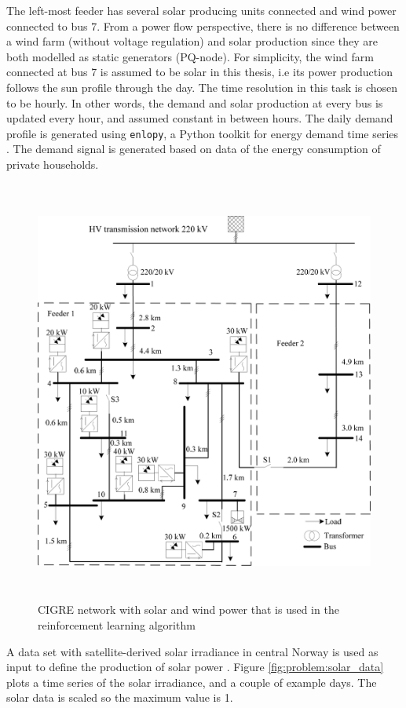 \documentclass[class=book, crop=false]{standalone}
\begin{document}
The left-most feeder has several solar producing units connected and wind power connected to bus 7. From a power flow perspective, there is no difference between a wind farm (without voltage regulation) and solar production since they are both modelled as static generators (PQ-node). For simplicity, the wind farm connected at bus 7 is assumed to be solar in this thesis, i.e its power production follows the sun profile through the day. The time resolution in this task is chosen to be hourly. In other words, the demand and solar production at every bus is updated every hour, and assumed constant in between hours. The daily demand profile is generated using \texttt{enlopy}, a Python toolkit for energy demand time series \cite{enlopy}. The demand signal is generated based on data of the energy consumption of private households.
\begin{figure}[ht]
    \center
    \includegraphics[height=14cm, width=13.5cm]{figures/cigre_network_mv_der.png}
    \caption[size = 9]{CIGRE network with solar and wind power that is used in the reinforcement learning algorithm \cite{cigre}}
    \label{fig:problem:cigre_network}
\end{figure}

A data set with satellite-derived solar irradiance in central Norway is used as input to define the production of solar power \cite{solar_data}. Figure \ref{fig:problem:solar_data} plots a time series of the solar irradiance, and a couple of example days. The solar data is scaled so the maximum value is 1.
\end{document}
